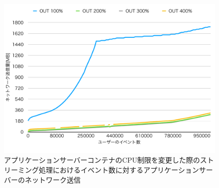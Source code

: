 \documentclass[../../../../../main]{subfiles}
\begin{document}
    \begin{figure}[H]
        \centering
        \includegraphics[width=12cm]{graph}
        \caption{アプリケーションサーバーコンテナのCPU制限を変更した際のストリーミング処理におけるイベント数に対するアプリケーションサーバーのネットワーク送信}
        \label{fig:stream-change-cpu-limit-app-net-out-app_1024-db_1_1024}
    \end{figure}
\end{document}
